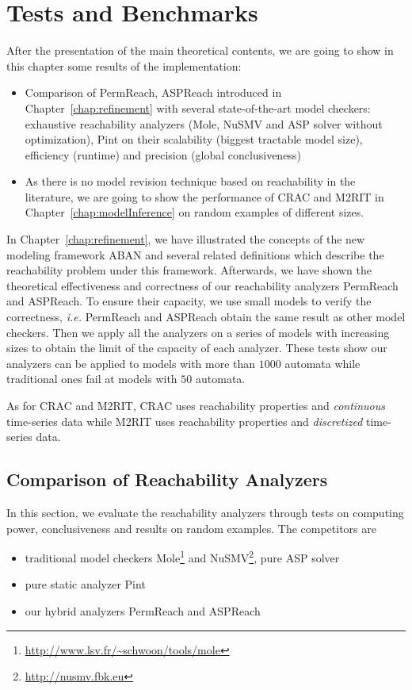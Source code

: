 \chapter{Tests and Benchmarks}\label{chap:test}
\begin{mybox}
After the presentation of the main theoretical contents, we are going to show in this chapter some results of the implementation:

\begin{itemize}
    \item Comparison of PermReach, ASPReach  introduced in Chapter~\ref{chap:refinement} with several state-of-the-art model checkers: exhaustive reachability analyzers (Mole, NuSMV and ASP solver without optimization), Pint on their scalability (biggest tractable model size), efficiency (runtime) and precision (global conclusiveness)
    \item As there is no model revision technique based on reachability in the literature, we are going to show the performance of CRAC and M2RIT in Chapter~\ref{chap:modelInference} on random examples of different sizes.
\end{itemize}
\end{mybox}

In Chapter~\ref{chap:refinement}, we have illustrated the concepts of the new modeling framework ABAN and several related definitions which describe the reachability problem under this framework.
Afterwards, we have shown the theoretical effectiveness and correctness of our reachability analyzers PermReach and ASPReach. 
To ensure their capacity, we use small models to verify the correctness, \textit{i.e.} PermReach and ASPReach obtain the same result as other model checkers.
Then we apply all the analyzers on a series of models with increasing sizes to obtain the limit of the capacity of each analyzer.
These tests show our analyzers can be applied to models with more than $1000$ automata while traditional ones fail at models with $50$ automata.

As for CRAC and M2RIT, CRAC uses reachability properties and \textit{continuous} time-series data while M2RIT uses reachability properties and \textit{discretized} time-series data.


\section{Comparison of Reachability Analyzers}\label{sec:compReachAnalyzers}
In this section, we evaluate the reachability analyzers through tests on computing power, conclusiveness and results on random examples.
The competitors are
\begin{itemize}
    \item traditional model checkers Mole\footnote{\url{http://www.lsv.fr/~schwoon/tools/mole}} and NuSMV\footnote{\url{http://nusmv.fbk.eu}}, pure ASP solver~\cite{abdallah2015exhaustive}
    \item pure static analyzer Pint~\cite{pauleve2017reduction}
    \item our hybrid analyzers PermReach and ASPReach
\end{itemize}

